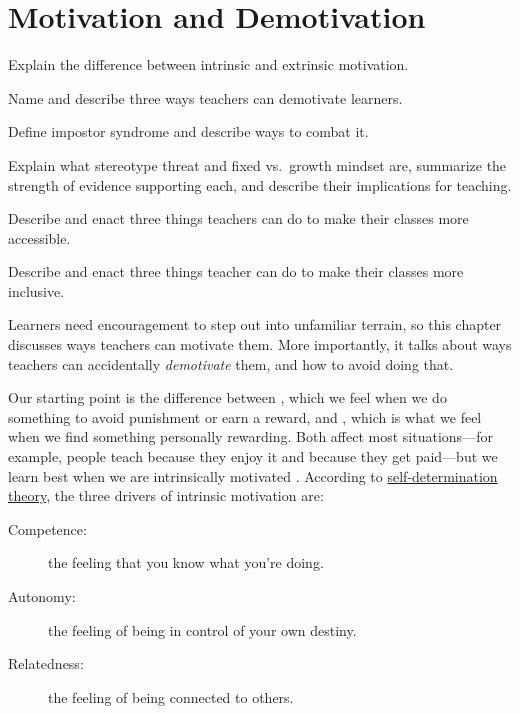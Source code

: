 \chapter{Motivation and Demotivation}\label{s:motivation}

\begin{objectives}

\item Explain the difference between intrinsic and extrinsic
  motivation.
  
\item Name and describe three ways teachers can demotivate learners.

\item Define impostor syndrome and describe ways to combat it.

\item Explain what stereotype threat and fixed vs.\ growth mindset
  are, summarize the strength of evidence supporting each, and
  describe their implications for teaching.

\item Describe and enact three things teachers can do to make their
  classes more accessible.

\item Describe and enact three things teacher can do to make their
  classes more inclusive.

\end{objectives}

Learners need encouragement to step out into unfamiliar terrain, so
this chapter discusses ways teachers can motivate them.  More
importantly, it talks about ways teachers can accidentally
\emph{demotivate} them, and how to avoid doing that.

Our starting point is the difference between
, which we feel
when we do something to avoid punishment or earn a reward, and
, which is what
we feel when we find something personally rewarding.  Both affect most
situations---for example, people teach because they enjoy it and
because they get paid---but we learn best when we are intrinsically
motivated \cite{Wlod2017}.  According to
\href{https://en.wikipedia.org/wiki/Self-determination_theory}{self-determination
  theory}, the three drivers of intrinsic motivation are:

\begin{description}

\item[Competence:]
  the feeling that you know what you're doing.

\item[Autonomy:]
  the feeling of being in control of your own destiny.

\item[Relatedness:]
  the feeling of being connected to others.

\end{description}


